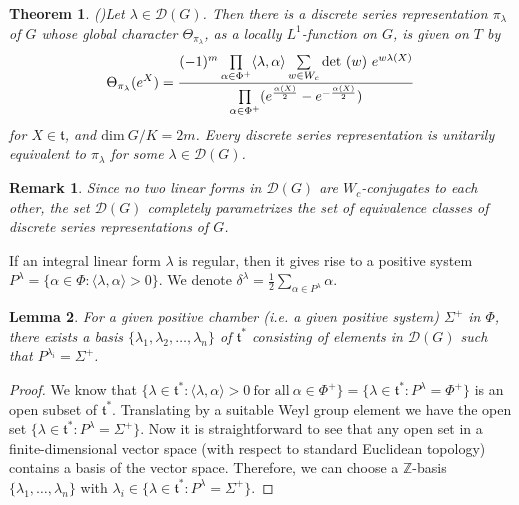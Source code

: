 \documentclass[11 pt]{amsart}
\newcommand{\Z}{{\mathbb Z}}
\newcommand{\dt}{{\rm det~}}
\newtheorem{theorem}{Theorem}[section]
\newtheorem{lemma}[theorem]{Lemma}
\theoremstyle{definition}
\newtheorem{remark}{Remark}[section]
\numberwithin{equation}{section}
\begin{document}
\begin{theorem}(\cite{HC})\label{discreteseries}
\textit{Let $\lambda \in \mathcal{D}(G)$. Then there is a discrete series representation $\pi_{\lambda}$ of $G$ whose global character $\Theta_{\pi_{\lambda}}$, as a locally $L^1$-function on $G$, is given on $T$ by 
$$ \Theta_{\pi_{\lambda}}( e^X ) = \frac {(-1)^m \prod\limits_{\alpha \in \Phi^+} \langle \lambda , \alpha \rangle \sum\limits_{w \in W_c} \dt(w)\ e^{w \lambda (X)}}{\prod\limits_{\alpha \in \Phi^+} ( e^{\frac{\alpha(X)}{2}} - e ^{- \frac{\alpha (X)}{2}})}$$ for $X \in \mathfrak{t}$, and $\text{dim}\ G/K= 2m$. Every discrete series representation is unitarily equivalent to $\pi_{\lambda}$ for some $\lambda \in \mathcal{D}(G)$.} 

\end{theorem} 

\begin{remark}
\textit{Since no two linear forms in $\mathcal{D}(G)$ are $W_c$-conjugates to each other, the set $\mathcal{D}(G)$ completely parametrizes the set of equivalence classes of discrete series representations of $G$.}
\end{remark}

\noindent If an integral linear form $\lambda$ is regular, then it gives rise to a positive system $P^{\lambda} =\{ \alpha \in \Phi : \langle \lambda , \alpha \rangle > 0 \}$. We denote $\delta^{\lambda} =\frac{1}{2} \sum\limits_{\alpha \in P^{\lambda}} \alpha $.

\begin{lemma}
\textit{For a given positive chamber (i.e. a given positive system) $\Sigma^+$ in $\Phi$, there exists a basis $\{ \lambda_1, \lambda_2, \dots ,\lambda_n\}$ of $\mathfrak{t}^*$ consisting of elements in $\mathcal{D}(G)$ such that $P^{\lambda_i}=\Sigma^+$.}
\end{lemma}

\begin{proof}
We know that $\{ \lambda \in \mathfrak{t}^* : \langle \lambda, \alpha \rangle > 0\ \text{for all}\ \alpha \in \Phi^+ \}= \{ \lambda \in \mathfrak{t}^* : P^{\lambda} = \Phi^+\}$ is an open subset of $\mathfrak{t}^*$. Translating by a suitable Weyl group element we have the open set $\{ \lambda \in \mathfrak{t}^* : P^{\lambda} = \Sigma^+ \}$. Now it is straightforward to see that any open set in a finite-dimensional vector space (with respect to standard Euclidean topology) contains a basis of the vector space. Therefore, we can choose a $\Z$-basis $\{ \lambda_1, \dots, \lambda_n\}$ with $\lambda_i \in \{ \lambda \in \mathfrak{t}^* : P^{\lambda}=\Sigma^+\}$.  
\end{proof}
\end{document}

